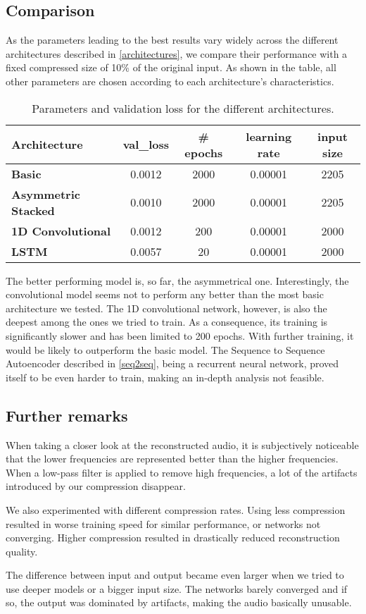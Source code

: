 \documentclass[11pt]{article}
\begin{document}
\subsection{Comparison} 
As the parameters leading to the best results vary widely across the different architectures described in \autoref{architectures}, we compare their performance with a fixed compressed size of 10\% of the original input. As shown in the table, all other parameters are chosen according to each architecture's characteristics. \par
\begin{table}[h]   \label{table}
\centering
{
\renewcommand{\arraystretch}{1.35}

\begin{tabular}{lcccc}
\hline
\textbf{Architecture}       & \textbf{val\_loss} & \# \textbf{epochs} & \textbf{learning rate} & \textbf{input size}  \\ \hline
\textbf{Basic}              & 0.0012    & 2000     & 0.00001       & 2205        \\ 
\textbf{Asymmetric Stacked} & 0.0010  & 2000    & 0.00001       & 2205        \\
\textbf{1D Convolutional}   & 0.0012    & 200      & 0.00001       & 2000        \\
\textbf{LSTM}               & 0.0057    & 20      & 0.00001       & 2000        \\
\hline
\end{tabular}
\caption{Parameters and validation loss for the different architectures.}
}
\end{table}
The better performing model is, so far, the asymmetrical one. Interestingly, the convolutional model seems not to perform any better than the most basic architecture we tested. The 1D convolutional network, however, is also the deepest among the ones we tried to train. As a consequence, its training is significantly slower and has been limited to 200 epochs. With further training, it would be likely to outperform the basic model.
The Sequence to Sequence Autoencoder described in \autoref{seq2seq}, being a recurrent neural network, proved itself to be even harder to train, making an in-depth analysis not feasible.

\subsection{Further remarks}\label{further}
When taking a closer look at the reconstructed audio, it is subjectively noticeable that the lower frequencies are represented better than the higher frequencies. When a low-pass filter is applied to remove high frequencies, a lot of the artifacts introduced by our compression disappear. \par
We also experimented with different compression rates. Using less compression resulted in worse training speed for similar performance, or networks not converging. Higher compression resulted in drastically reduced reconstruction quality. \par
The difference between input and output became even larger when we tried to use deeper models or a bigger input size. The networks barely converged and if so, the output was dominated by artifacts, making the audio basically unusable. 
\end{document}
